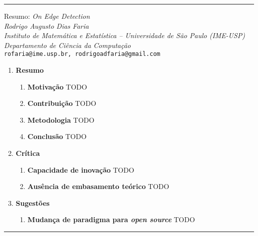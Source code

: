 \noindent\rule{14.5cm}{0.4pt}

\begin{center}
    {\Large Resumo: \textit{On Edge Detection}}
    \\[8pt]
    
    \textit{Rodrigo Augusto Dias Faria}
    \\[8pt]
    
    \textit{Instituto de Matemática e Estatística -- Universidade de São Paulo (IME-USP)\\
    Departamento de Ciência da Computação
    }\\[8pt]
    
    \texttt{rofaria@ime.usp.br, rodrigoadfaria@gmail.com}
\end{center}

\begin{enumerate}
\item \textbf{Resumo}
\begin{enumerate}[label*=\arabic*.]
    \item \textbf{Motivação}
    TODO
    \\[6pt]

    \item \textbf{Contribuição}
    TODO
    \\[6pt]

    \item \textbf{Metodologia}
    TODO
    \\[6pt]

    \item \textbf{Conclusão}
    TODO
\end{enumerate}

\item \textbf{Crítica}
\begin{enumerate}[label*=\arabic*.]
    \item \textbf{Capacidade de inovação}
    TODO
    \\[6pt]
    
    \item \textbf{Ausência de embasamento teórico}
    TODO
\end{enumerate}

\item \textbf{Sugestões}
\begin{enumerate}[label*=\arabic*.]
    \item \textbf{Mudança de paradigma para \textit{open source}}
    TODO
\end{enumerate}
\end{enumerate}
\noindent\rule{14.5cm}{0.4pt}